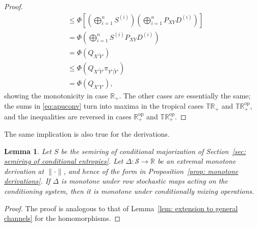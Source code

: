 \documentclass[aps,pra,11pt,onecolumn,nofootinbib,tightenlines]{revtex4-2}
\newtheorem{lemma}[theorem]{Lemma}
\theoremstyle{definition}
\begin{document}
\begin{proof}
\begin{align}
&\leq\Phi\left[\left(\bigoplus_{i=1}^n S^{(i)}\right)\left(\bigoplus_{i=1}^n P_{XY}D^{(i)}\right)\right]\\
&=\Phi\left(\bigoplus_{i=1}^n S^{(i)}P_{XY}D^{(i)}\right)\\
&=\Phi(Q_{X'\widetilde{Y}'})\\
&\leq\Phi(Q_{X'\widetilde{Y}'}\pi_{Y'|\widetilde{Y}'})\\
&=\Phi(Q_{X'Y'}),
\end{align}
showing the monotonicity in case $\mathbb{R}_+$. The other cases are essentially the same; the sums in \eqref{eq:apuconv} turn into maxima in the tropical cases $\mathbb{TR}_+$ and $\mathbb{TR}^{\mathrm{op}}_+$, and the inequalities are reversed in cases $\mathbb{R}^{\mathrm{op}}_+$ and $\mathbb{TR}^{\mathrm{op}}_+$.
\end{proof}
The same implication is also true for the derivations.
\begin{lemma}
Let $S$ be the semiring of conditional majorization of Section~\ref{sec: semiring of conditional entropies}. Let $\Delta: \mathcal{S} \to \mathbb{R}$ be an extremal monotone derivation at $\|\cdot\|$, and hence of the form in Proposition~\ref{prop: monotone derivations}.
If $\Delta$ is monotone under row stochastic maps acting on the conditioning system, then it is monotone under conditionally mixing operations.
\end{lemma}
\begin{proof}
    The proof is analogous to that of Lemma~\ref{lem: extension to general channels} for the homomorphisms.
\end{proof}

\clearpage

\end{document}
